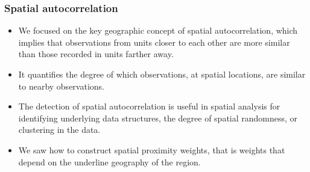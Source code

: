 \documentclass[12pt]{beamer}
\begin{document}
\begin{frame}
\frametitle{Spatial autocorrelation}
\begin{itemize} \setlength\itemsep{\fill}
\item We focused on the key geographic concept of \alert{spatial autocorrelation}, which implies that observations from units closer to each other are more similar than those recorded in units farther away.
\item It quantifies the degree of which observations, at spatial locations, are similar to nearby observations.
\item  The detection of spatial autocorrelation is useful in spatial analysis for identifying underlying data structures, the degree of spatial randomness, or clustering in the data.
\item We saw how to construct \alert{spatial proximity weights}, that is weights that depend on the underline geography of the region.
\end{itemize}
\end{frame}
\end{document}

